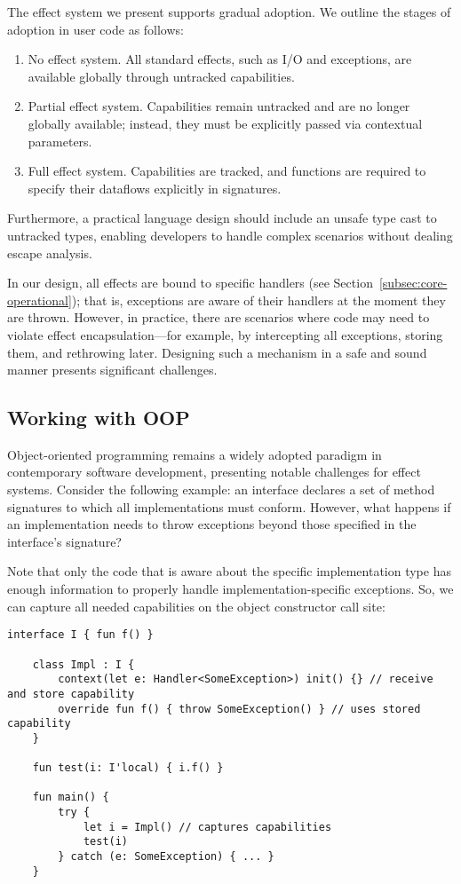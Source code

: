 \documentclass[acmsmall,review,screen]{acmart}
\begin{document}
The effect system we present supports gradual adoption.
We outline the stages of adoption in user code as follows:
\begin{enumerate}
    \item No effect system.
    All standard effects, such as I/O and exceptions, are available globally through untracked capabilities.
    \item Partial effect system.
    Capabilities remain untracked and are no longer globally available; instead, they must be explicitly passed via contextual parameters.
    \item Full effect system.
    Capabilities are tracked, and functions are required to specify their dataflows explicitly in signatures.
\end{enumerate}

Furthermore, a practical language design should include an unsafe type cast to untracked types, enabling developers to handle complex scenarios without dealing escape analysis.

In our design, all effects are bound to specific handlers (see Section~\ref{subsec:core-operational}); that is, exceptions are aware of their handlers at the moment they are thrown.
However, in practice, there are scenarios where code may need to violate effect encapsulation—for example, by intercepting all exceptions, storing them,
 and rethrowing later.
Designing such a mechanism in a safe and sound manner presents significant challenges.

\subsection{Working with OOP} \label{subsec:oop}

Object-oriented programming remains a widely adopted paradigm in contemporary software development, presenting notable challenges for effect systems.
Consider the following example: an interface declares a set of method signatures to which all implementations must conform.
However, what happens if an implementation needs to throw exceptions beyond those specified in the interface’s signature?

Note that only the code that is aware about the specific implementation type has enough information to properly handle implementation-specific exceptions.
So, we can capture all needed capabilities on the object constructor call site:
\begin{lstlisting}[language=colang]
    interface I { fun f() }

    class Impl : I {
        context(let e: Handler<SomeException>) init() {} // receive and store capability
        override fun f() { throw SomeException() } // uses stored capability
    }

    fun test(i: I'local) { i.f() }

    fun main() {
        try {
            let i = Impl() // captures capabilities
            test(i)
        } catch (e: SomeException) { ... }
    }
\end{lstlisting}
\end{document}
